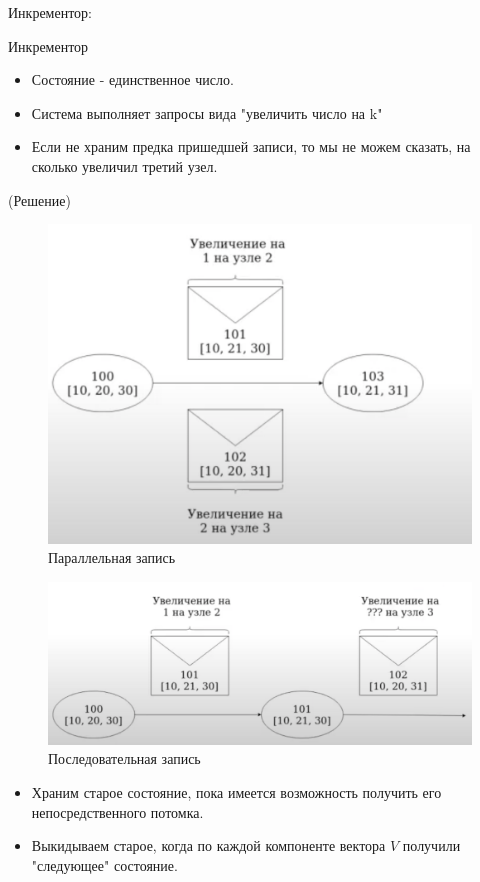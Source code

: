     \begin{example}
      Инкрементор:\\
      \begin{definition}
      Инкрементор
      \end{definition}
        \begin{itemize}
          \item Состояние - единственное число.
          \item Система выполняет запросы вида "увеличить число на k"
          \item Если не храним предка пришедшей записи, то мы не можем сказать, на сколько увеличил третий узел.
        \end{itemize}
        \begin{algorithm}(Решение)
          \begin{figure}[h]
              \centering
              \includegraphics[scale = 0.5]{../assets/15.png}
              \caption{Параллельная запись}
          \end{figure}
          \begin{figure}[h]
              \centering
              \includegraphics[scale = 0.5]{../assets/16.png}
              \caption{Последовательная запись}
          \end{figure}
          \begin{itemize}
            \item Храним старое состояние, пока имеется возможность получить его непосредственного потомка.
            \item Выкидываем старое, когда по каждой компоненте вектора $V$ получили "следующее" состояние.
          \end{itemize}
        \end{algorithm}
    \end{example}
